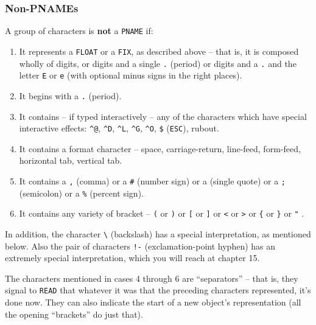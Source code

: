\documentclass[a4paper]{scrbook}
\begin{document}
\subsubsection{Non-PNAMEs}\label{non-pnames}

A group of characters is \textbf{not} a \texttt{PNAME} if:

\begin{enumerate}
\def\labelenumi{\arabic{enumi}.}
\item
  It represents a \texttt{FLOAT} or a \texttt{FIX}, as described above -- that is, it is composed wholly of digits, or
  digits and a single \texttt{.}  (period) or digits and a \texttt{.} and the letter \texttt{E} or
  \texttt{e} (with optional minus signs in the right places).
\item
  It begins with a \texttt{.} (period).
\item
  It contains -- if typed interactively -- any of the characters which have special interactive effects: \texttt{\^{}@},
  \texttt{\^{}D}, \texttt{\^{}L}, \texttt{\^{}G}, \texttt{\^{}O}, \texttt{\$} (\texttt{ESC}), rubout.
\item
  It contains a format character -- space, carriage-return, line-feed, form-feed, horizontal tab, vertical tab.
\item
  It contains a \texttt{,}  (comma) or a \texttt{\#} \index{\texttt{\#}} (number sign) or a
  \texttt{\textquotesingle{}}  (single quote) or a \texttt{;} \index{\texttt{;}} (semicolon) or a
  \texttt{\%} \index{\texttt{\%}} (percent sign).
\item
  It contains any variety of bracket -- \texttt{(} \index{\texttt{(}} or \texttt{)} \index{\texttt{)}} or
  \texttt{{[}}\index{\texttt{[}} or \texttt{{]}}\index{\texttt{]}} or \texttt{\textless{}} \index{\texttt{<}} or
  \texttt{\textgreater{}} \index{\texttt{>}} or \texttt{\{}  or \texttt{\}}
   or \texttt{"} .
\end{enumerate}

In addition, the character \texttt{\textbackslash{}} (backslash) has a special interpretation, as mentioned below. Also the
pair of characters \texttt{!-} (exclamation-point hyphen) has an extremely special interpretation, which you will reach at
chapter 15.

The characters mentioned in cases 4 through 6 are ``separators'' -- that is, they signal to \texttt{READ} that whatever it
was that the preceding characters represented, it's done now. They can also indicate the start of a new object's
representation (all the opening ``brackets'' do just that).
\end{document}

